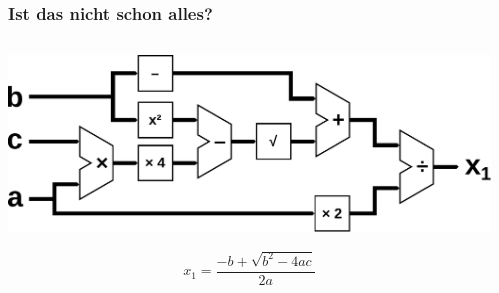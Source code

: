 \documentclass[t,aspectratio=169,usenames,dvipsnames]{beamer}
\begin{document}
\begin{frame}
  \frametitle{Ist das nicht schon alles?}

  \begin{columns}
    \begin{column}{.45\textwidth}
      \begin{center}
        \includegraphics[width=\linewidth]{abc-formel.pdf}

        \[ x_1 = \frac{-b + \sqrt{b^2 - 4ac}}{2a} \]
      \end{center}
    \end{column}
    \begin{column}{.45\textwidth}
    \end{column}
  \end{columns}
\end{frame}
\end{document}
